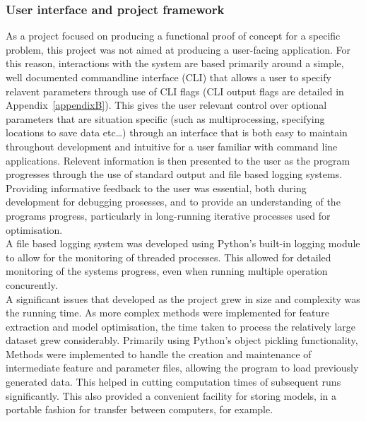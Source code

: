\documentclass[titlepage, 12pt]{scrartcl} \usepackage{enumitem}
\begin{document}
\subsubsection{User interface and project framework}
As a project focused on producing a functional proof of concept for a specific
problem, this project was not aimed at producing a user-facing application. For
this reason, interactions with the system are based primarily around a simple,
well documented commandline interface (CLI) that allows a user to specify
relavent parameters through use of CLI flags (CLI output flags are detailed in
Appendix~\ref{appendixB}). This gives the user relevant
control over optional parameters that are situation specific (such as
multiprocessing, specifying locations to save data etc\ldots) through an interface that is both easy to maintain throughout
development and intuitive for a user familiar with command line applications.
Relevent information is then presented to the user as the program progresses
through the use of standard output and file based logging systems. Providing
informative feedback to the user was essential, both during development for
debugging prosesses, and to provide an understanding of the programs progress,
particularly in long-running iterative processes used for optimisation.\\
A file based logging system was developed using Python's built-in logging
module to allow for the monitoring of threaded processes. This allowed for
detailed monitoring of the systems progress, even when running multiple
operation concurently.\\

A significant issues that developed as the project grew in size and complexity
was the running time. As more complex methods were implemented for feature
extraction and model optimisation, the time taken to process the relatively
large dataset grew considerably. Primarily using Python's object pickling
functionality, Methods were implemented to handle the creation and maintenance
of intermediate feature and parameter files, allowing the program to load
previously generated data. This helped in cutting  computation times of
subsequent runs significantly. This also provided a convenient facility for
storing models, in a portable fashion for transfer between computers, for
example.
\end{document}
